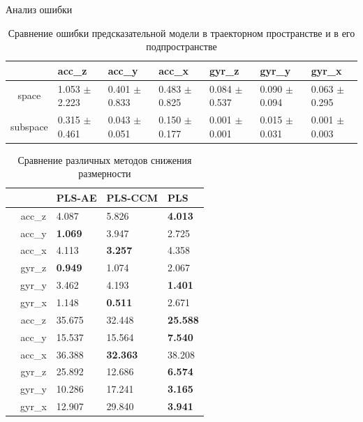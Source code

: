 \documentclass{beamer}
\begin{document}
	\begin{frame}{Анализ ошибки}
		\begin{table}[bhtp]
			\fontsize{4pt}{8pt}
			\selectfont
			\centering
			\caption{Сравнение ошибки предсказательной модели в траекторном пространстве и в его подпространстве}
			\label{tbl:space_and_subspace}
			\begin{tabularx}{\textwidth}{c|XXXXXX}
				\hline
				& acc\_z & acc\_y & acc\_x & gyr\_z & gyr\_y & gyr\_x \\
				\hline
				space & 1.053 $\pm$ 2.223 & 0.401 $\pm$ 0.833 & 0.483 $\pm$ 0.825 & 0.084 $\pm$ 0.537 & 0.090 $\pm$ 0.094 & 0.063 $\pm$ 0.295 \\
				subspace & 0.315 $\pm$ 0.461 & 0.043 $\pm$ 0.051 & 0.150 $\pm$ 0.177 & 0.001 $\pm$ 0.001	& 0.015 $\pm$ 0.031 & 0.001 $\pm$ 0.003 \\
				\hline
			\end{tabularx}
		\end{table}

		\begin{table}[bhtp]
			\tiny
			\centering
			\caption{Сравнение различных методов снижения размерности}
			\label{tbl:methods}
			\begin{tabular}{l|c|lll}
				\hline
				\multicolumn{2}{l}{\diaghead{\hskip4cm}{Целевой признак}{Метод}} \vline & PLS-AE & PLS-CCM & PLS \\
				\hline
				\multirow{6}{*}{\rotatebox[origin=c]{90}{cyclic}} & acc\_z & 4.087 & 5.826 & \textbf{4.013} \\
				& acc\_y & \textbf{1.069} & 3.947 & 2.725 \\
				& acc\_x & 4.113 & \textbf{3.257} & 4.358 \\
				& gyr\_z & \textbf{0.949} & 1.074 & 2.067 \\
				& gyr\_y & 3.462 & 4.193 & \textbf{1.401} \\
				& gyr\_x & 1.148 & \textbf{0.511} & 2.671 \\
				\hline
				\multirow{6}{*}{\rotatebox[origin=c]{90}{chaotic}} & acc\_z & 35.675 & 32.448 & \textbf{25.588} \\
				& acc\_y & 15.537 & 15.564 & \textbf{7.540} \\
				& acc\_x & 36.388 & \textbf{32.363} & 38.208 \\
				& gyr\_z & 25.892 & 12.686 & \textbf{6.574} \\
				& gyr\_y & 10.286 & 17.241 & \textbf{3.165} \\
				& gyr\_x & 12.907 & 29.840 & \textbf{3.941} \\
				\hline   
			\end{tabular}
		\end{table}
	\end{frame}
\end{document}
